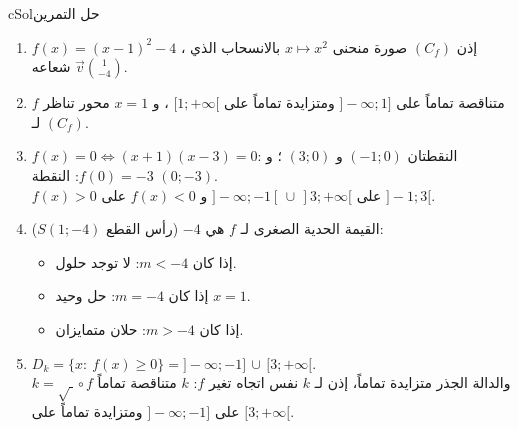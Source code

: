 \documentclass[12pt,a4paper]{article}
\newcounter{exo}
\newenvironment{hal}{\Needspace{12\baselineskip}\begin{otherlanguage}{english}\begin{arbox}[breakable]{cSol}{حل التمرين \theexo}}{\end{arbox}\end{otherlanguage}}
\newenvironment{LTR}{\begin{otherlanguage}{english}}{\end{otherlanguage}}
\newcommand{\Grid}[4]{%
 \draw[gray!25] (#1,#3) grid (#2,#4);
 \draw[-{Stealth}] (#1-0.2,0)--(#2+0.3,0) node[below]{$x$};
 \draw[-{Stealth}] (0,#3-0.2)--(0,#4+0.3) node[left]{$y$};
 \node[below left,font=\scriptsize] at (0,0){$O$};}
\begin{document}
\begin{hal}
\begin{minipage}{0.6\textwidth}
\begin{enumerate}
\item $f(x)=(x-1)^2-4$ ، إذن $(C_f)$ صورة منحنى $x\mapsto x^2$ بالانسحاب الذي شعاعه $\vec v\binom{1}{-4}$.
\item $f$ متناقصة تماماً على $]-\infty;1]$ ومتزايدة تماماً على $[1;+\infty[$ ، و $x=1$ محور تناظر لـ $(C_f)$.
\item $f(x)=0\iff(x+1)(x-3)=0$: النقطتان $(-1;0)$ و $(3;0)$ ؛ و $f(0)=-3$: النقطة $(0;-3)$.\\
$f(x)>0$ على $]-\infty;-1[\,\cup\,]3;+\infty[$ و $f(x)<0$ على $]-1;3[$.
\end{enumerate}
\end{minipage}\hfill
\begin{minipage}{0.37\textwidth}
\centering
\begin{LTR}
\end{LTR}
\end{minipage}
\begin{enumerate}\setcounter{enumi}{3}
\item القيمة الحدية الصغرى لـ $f$ هي $-4$ (رأس القطع $S(1;-4)$):
\begin{itemize}
\item إذا كان $m<-4$: لا توجد حلول.
\item إذا كان $m=-4$: حل وحيد $x=1$.
\item إذا كان $m>-4$: حلان متمايزان.
\end{itemize}
\item $D_k=\{x:\ f(x)\ge0\}=\boxed{]-\infty;-1]\,\cup\,[3;+\infty[}$.\\
$k=\sqrt{\ }\circ f$ والدالة الجذر متزايدة تماماً، إذن لـ $k$ نفس اتجاه تغير $f$:
$k$ متناقصة تماماً على $]-\infty;-1]$ ومتزايدة تماماً على $[3;+\infty[$.
\end{enumerate}
\end{hal}
\end{document}

